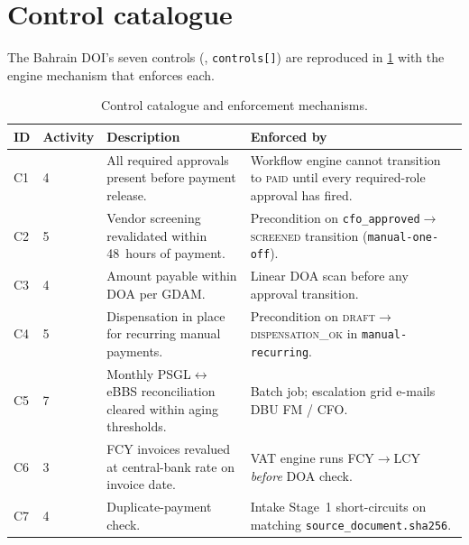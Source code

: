 \documentclass[11pt,a4paper,twoside]{report}
\newcommand{\corpus}{}
\begin{document}
\section{Control catalogue}

The Bahrain DOI's seven controls
(\corpus{},
\texttt{controls[]}) are reproduced in \cref{tab:controls} with the
engine mechanism that enforces each.

\begin{table}[htbp]
\centering
\caption{Control catalogue and enforcement mechanisms.}
\label{tab:controls}
\small
\begin{tabularx}{\linewidth}{@{}l l X X@{}}
\toprule
\textbf{ID} & \textbf{Activity} & \textbf{Description} & \textbf{Enforced by} \\ \midrule
C1 & 4 & All required approvals present before payment release. & Workflow engine cannot transition to \textsc{paid} until every required-role approval has fired. \\
C2 & 5 & Vendor screening revalidated within 48~hours of payment. & Precondition on \texttt{cfo\_approved}$\to$\textsc{screened} transition (\texttt{manual-one-off}). \\
C3 & 4 & Amount payable within DOA per GDAM. & Linear DOA scan before any approval transition. \\
C4 & 5 & Dispensation in place for recurring manual payments. & Precondition on \textsc{draft}$\to$\textsc{dispensation\_ok} in \texttt{manual-recurring}. \\
C5 & 7 & Monthly PSGL$\leftrightarrow$eBBS reconciliation cleared within aging thresholds. & Batch job; escalation grid e-mails DBU FM / CFO. \\
C6 & 3 & FCY invoices revalued at central-bank rate on invoice date. & VAT engine runs FCY$\to$LCY \emph{before} DOA check. \\
C7 & 4 & Duplicate-payment check. & Intake Stage~1 short-circuits on matching \texttt{source\_document.sha256}. \\
\bottomrule
\end{tabularx}
\end{table}
\end{document}
